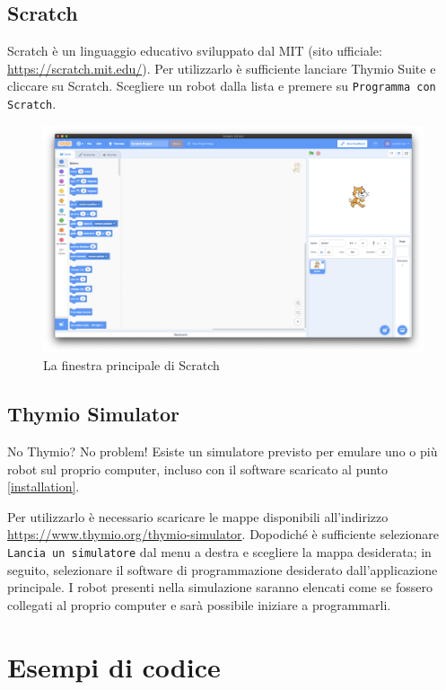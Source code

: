 \documentclass[12pt]{article}
\begin{document}
	\subsection{Scratch}
	
		Scratch è un linguaggio educativo sviluppato dal MIT (sito ufficiale: \url{https://scratch.mit.edu/}). Per utilizzarlo è sufficiente lanciare Thymio Suite e cliccare su Scratch. Scegliere un robot dalla lista e premere su \texttt{Programma con Scratch}.
		
		\begin{figure}[H]
			\includegraphics[width=\textwidth]{img/scratch.png}
			\caption{La finestra principale di Scratch}
			\label{main_scratch}
		\end{figure}
		
	\subsection{Thymio Simulator}
	
		No Thymio? No problem! Esiste un simulatore previsto per emulare uno o più robot sul proprio computer, incluso con il software scaricato al punto \ref{installation}.
		
		Per utilizzarlo è necessario scaricare le mappe disponibili all'indirizzo \url{https://www.thymio.org/thymio-simulator}. Dopodiché è sufficiente selezionare \texttt{Lancia un simulatore} dal menu a destra e scegliere la mappa desiderata; in seguito, selezionare il software di programmazione desiderato dall'applicazione principale.
		I robot presenti nella simulazione saranno elencati come se fossero collegati al proprio computer e sarà possibile iniziare a programmarli.
		
		
\section{Esempi di codice}
\end{document}
